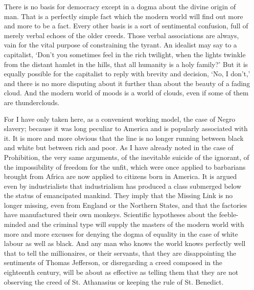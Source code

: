 \documentclass{book}
\begin{document}
There is no basis for democracy except in a dogma about the divine origin of man. That is a perfectly simple fact which the modern world will find out more and more to be a fact. Every other basis is a sort of sentimental confusion, full of merely verbal echoes of the older creeds. Those verbal associations are always, vain for the vital purpose of constraining the tyrant. An idealist may say to a capitalist, ‘Don’t you sometimes feel in the rich twilight, when the lights twinkle from the distant hamlet in the hills, that all humanity is a holy family?’ But it is equally possible for the capitalist to reply with brevity and decision, ‘No, I don’t,’ and there is no more disputing about it further than about the beauty of a fading cloud. And the modern world of moods is a world of clouds, even if some of them are thunderclouds.

For I have only taken here, as a convenient working model, the case of Negro slavery; because it was long peculiar to America and is popularly associated with it. It is more and more obvious that the line is no longer running between black and white but between rich and poor. As I have already noted in the case of Prohibition, the very same arguments, of the inevitable suicide of the ignorant, of the impossibility of freedom for the unfit, which were once applied to barbarians brought from Africa are now applied to citizens born in America. It is argued even by industrialists that industrialism has produced a class submerged below the status of emancipated mankind. They imply that the Missing Link is no longer missing, even from England or the Northern States, and that the factories have manufactured their own monkeys. Scientific hypotheses about the feeble-minded and the criminal type will supply the masters of the modern world with more and more excuses for denying the dogma of equality in the case of white labour as well as black. And any man who knows the world knows perfectly well that to tell the millionaires, or their servants, that they are disappointing the sentiments of Thomas Jefferson, or disregarding a creed composed in the eighteenth century, will be about as effective as telling them that they are not observing the creed of St. Athanasius or keeping the rule of St. Benedict.
\end{document}
